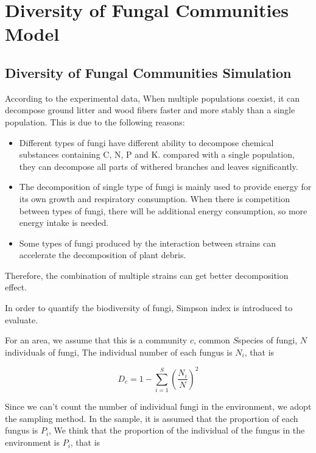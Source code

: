 \documentclass{mcmthesis}
\begin{document}
\section{Diversity of Fungal Communities Model}

\subsection{Diversity of Fungal Communities Simulation}

According to the experimental data\cite{maynard2019consistent}, When multiple populations coexist, it can decompose ground litter and wood fibers faster and more stably than a single population. This is due to the following reasons:

\begin{itemize}
  \item Different types of fungi have different ability to decompose chemical substances containing C, N, P and K. compared with a single population, they can decompose all parts of withered branches and leaves significantly.
  \item The decomposition of single type of fungi is mainly used to provide energy for its own growth and respiratory consumption. When there is competition between types of fungi, there will be additional energy consumption, so more energy intake is needed.
  \item Some types of fungi produced by the interaction between strains can accelerate the decomposition of plant debris.
\end{itemize}

Therefore, the combination of multiple strains can get better decomposition effect.

In order to quantify the biodiversity of fungi, Simpson index is introduced to evaluate.

For an area, we assume that this is a community $ c $, common $ S $species of fungi, $ N $individuals of fungi, The individual number of each fungus is $ N_i $, that is

\begin{equation}
  D_c=1-\sum_{i=1}^{S}\left(\frac{N_i}{N}\right)^{2}
\end{equation}

Since we can't count the number of individual fungi in the environment, we adopt the sampling method. In the sample, it is assumed that the proportion of each fungus is $ P_i $, We think that the proportion of the individual of the fungus in the environment is $ P_i $, that is
\end{document}
